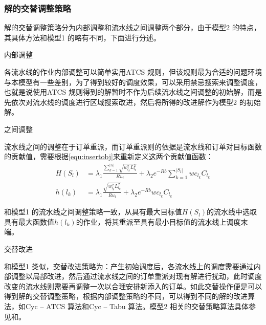 \subsubsection{解的交替调整策略}
解的交替调整策略分为内部调整和流水线之间调整两个部分，由于模型2 的特点，其具体方法和模型1 的略有不同，下面进行分述。
\begin{asparaenum}
\item 内部调整

各流水线的作业内部调整可以简单实用ATCS 规则，但该规则最为合适的问题环境与本模型有一些差别，为了得到较好的调度效果，可以采用禁忌搜索来调整调度，也就是说使用ATCS 规则得到的解暂时不作为后续流水线之间调整的初始解，而是先依次对流水线的调度进行区域搜索改进，然后将所得的改进解作为模型2 的初始解。

\item 之间调整

流水线之间的调整在于订单重派，而订单重派则的依据是流水线和订单对目标函数的贡献值，需要根据\eqref{equ:insertobj}来重新定义这两个贡献值函数：
\begin{align}
H(S_l) &= \lambda_1\frac{\sum_{k=1}^{|S_l|}\sqrt{w_{l_k}^2L_{l_k}^2}}{Ru_l} + \lambda_2 e^{-Rb}\sum_{k=1}^{|S_l|}wc_{l_k}C_{l_k}\label{equ:lineinsertfunct}\\
h(l_k) &= \lambda_1\frac{\sqrt{w_{l_k}^2L_{l_k}^2}}{Ru_l} + \lambda_2 e^{-Rb}wc_{l_k}C_{l_k}
\label{equ:iteminsertfunct}
\end{align}

和模型1 的流水线之间调整策略一致，从具有最大目标值$H(S_l)$的流水线中选取具有最大函数值$h(l_k)$的作业，将其重派至具有最小目标值的流水线上调度末端。
\item 交替改进
\end{asparaenum}

和模型1 类似，交替改进策略为：产生初始调度后，各流水线上的调度需要通过内部调整以局部改进，然后通过流水线之间的订单重派对现有解进行扰动，此时调度改变的流水线则需要再调整一次以合理安排新添入的订单。如此交替操作便是可以得到解的交替调整策略，根据内部调整策略的不同，可以得到不同的解的改进算法，如Cyc -- ATCS 算法和Cyc -- Tabu 算法。模型2 相关的交替策略算法具体参见和。


